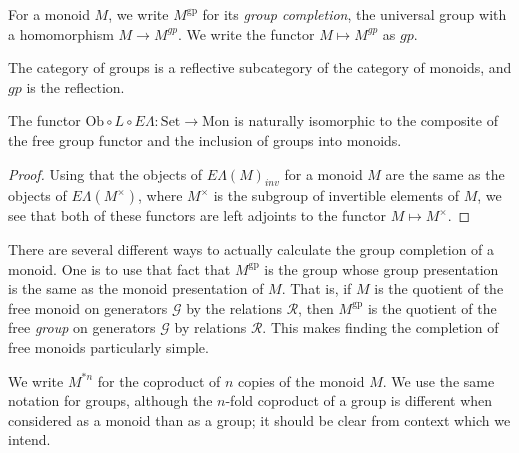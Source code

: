 \documentclass{amsbook} %
\newcommand{\Set}{\ensuremath{\textrm{Set}}}
\newcommand{\EL}{E\Lambda}
\newcommand{\ELn}{E\Lambda(\underline{n})}
\newcommand{\ob}{\textrm{Ob}}
\newcommand{\sets}{\Set}
\newcommand{\mon}{\ensuremath{\textrm{Mon}}}
\numberwithin{section}{chapter}
\begin{document}

\begin{Defi} For a monoid $M$, we write $M^{\mathrm{gp}}$ for its \emph{group completion}, the universal group with a homomorphism $M \to M^{gp}$.  We write the functor $M \mapsto M^{gp}$ as $gp$.
\end{Defi}

\begin{rem}
The category of groups is a reflective subcategory of the category of monoids, and $gp$ is the reflection.
\end{rem}

\begin{prop}\label{oblel_fg}
The functor $\ob \circ L \circ \EL: \sets \to \mon$ is naturally isomorphic to the composite of the free group functor and the inclusion of groups into monoids.
\end{prop}
\begin{proof}
Using that the objects of $\EL(M)_{inv}$ for a monoid $M$ are the same as the objects of $\EL(M^{\times})$, where $M^{\times}$ is the subgroup of invertible elements of $M$, we see that both of these functors are left adjoints to the functor $M \mapsto M^{\times}$.
\end{proof}
There are several different ways to actually calculate the group completion of a monoid. One is to use that fact that $M^{\mathrm{gp}}$ is the group whose group presentation is the same as the monoid presentation of $M$. That is, if $M$ is the quotient of the free monoid on generators $\mathcal{G}$ by the relations $\mathcal{R}$, then $M^{\mathrm{gp}}$ is the quotient of the free \emph{group} on generators $\mathcal{G}$ by relations $\mathcal{R}$. This makes finding the completion of free monoids particularly simple.

\begin{nota}
We write $M^{*n}$ for the coproduct of $n$ copies of the monoid $M$. We use the same notation for groups, although the $n$-fold coproduct of a group is different when considered as a monoid than as a group; it should be clear from context which we intend.
\end{nota}
\end{document}
